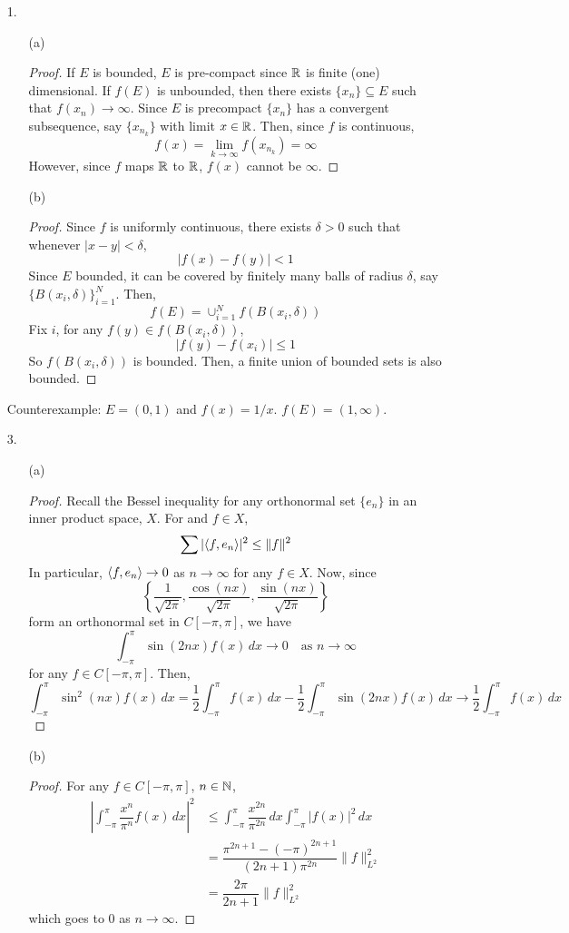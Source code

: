 \begin{itemize}
\item[1.]
	\begin{itemize}
		\item[(a)] \begin{proof} If $E$ is bounded, $E$ is pre-compact since $\mathbb{R}$ is finite (one) dimensional. If $f(E)$ is unbounded, then there exists $\{x_n\} \subseteq E$ such that $f(x_n) \to \infty$. Since $E$ is precompact $\{x_n\}$ has a convergent subsequence, say $\{x_{n_k}\}$ with limit $x \in \mathbb{R}$. Then, since $f$ is continuous,
		\[ f(x) = \lim_{k \to \infty} f(x_{n_k}) = \infty \]
	However, since $f$ maps $\mathbb{R}$ to $\mathbb{R}$, $f(x)$ cannot be $\infty$. 
		\end{proof}
		
		\item[(b)]
		\begin{proof}
		Since $f$ is uniformly continuous, there exists $\delta >0$ such that whenever $|x-y|<\delta$, 
		\[ |f(x)-f(y)| <1 \]
		Since $E$  bounded, it can be covered by finitely many balls of radius $\delta$, say $\{B(x_i,\delta)\}_{i=1}^N$. Then,
		\[ f(E) = \cup_{i=1}^N f(B(x_i,\delta)) \]
		Fix $i$, for any $f(y) \in f(B(x_i,\delta))$,
			\[ |f(y)-f(x_i)| \le 1 \]
		So $f(B(x_i,\delta))$ is bounded. Then, a finite union of bounded sets is also bounded.
		\end{proof}
	\end{itemize}
Counterexample: $E=(0,1)$ and $f(x)=1/x$. $f(E) = (1,\infty)$.

\item[3.]
	\begin{itemize}
		\item[(a)]\begin{proof} Recall the Bessel inequality for any orthonormal set $\{e_n\}$ in an inner product space, $X$. For and $f \in X$,
		\[ \sum |\langle f,e_n\rangle|^2 \le \|f\|^2 \]
		In particular, $\langle f,e_n\rangle \to 0$ as $n \to \infty$ for any $f \in X$. Now, since 
		\[ \left\{ \dfrac{1}{\sqrt{2\pi}},\dfrac{\cos(n x)}{\sqrt{2\pi}},\dfrac{\sin(n x)}{\sqrt{2\pi}}\right\} \]
		form an orthonormal set in $C[-\pi,\pi]$, we have
		\[ \int_{-\pi}^\pi \sin(2 n x) f(x) \, dx \to 0 \quad \mbox{as } n \to \infty\]
		for any $f \in C[-\pi,\pi]$. Then,
		\[ \int_{-\pi}^\pi \sin^2(nx) f(x) \,dx = \dfrac 12 \int_{-\pi}^\pi f(x) \, dx - \dfrac 12 \int_{-\pi}^\pi \sin(2 n x)f(x) \, dx \to \dfrac 12 \int_{-\pi}^\pi f(x) \, dx \]
		\end{proof}

		\item[(b)]
		\begin{proof}For any $f \in C[-\pi,\pi]$, $n \in \mathbb{N}$,
		\begin{align*}
			\left| \int_{-\pi}^\pi \dfrac{x^n}{\pi^n} f(x)\, dx \right|^2 &\le \int_{-\pi}^\pi \dfrac{x^{2n}}{\pi^{2n}} \, dx \int_{-\pi}^\pi |f(x)|^2 \, dx \\
			&= \dfrac{\pi^{2n+1}-(-\pi)^{2n+1}}{(2n+1)\pi^{2n}} \|f\|_{L^2}^2 \\
			&= \dfrac{2\pi}{2n+1} \|f\|_{L^2}^2
		\end{align*}
		which goes to $0$ as $n \to \infty$.
		\end{proof}
	\end{itemize}
\end{itemize}